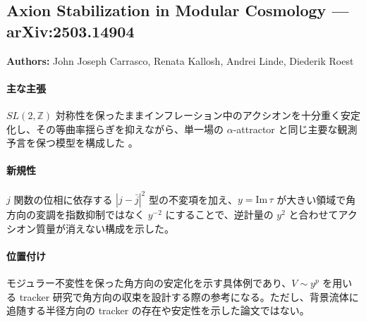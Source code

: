 \subsection{Axion Stabilization in Modular Cosmology --- arXiv:2503.14904}

\textbf{Authors:} John Joseph Carrasco, Renata Kallosh, Andrei Linde, Diederik Roest

\paragraph{主な主張}
$SL(2,\mathbb{Z})$ 対称性を保ったままインフレーション中のアクシオンを十分重く安定化し、その等曲率揺らぎを抑えながら、単一場の $\alpha$-attractor と同じ主要な観測予言を保つ模型を構成した \cite{Carrasco:2025axion}。

\paragraph{新規性}
$j$ 関数の位相に依存する $|j-\bar j|^2$ 型の不変項を加え、$y=\mathrm{Im}\,\tau$ が大きい領域で角方向の変調を指数抑制ではなく $y^{-2}$ にすることで、逆計量の $y^2$ と合わせてアクシオン質量が消えない構成を示した。

\paragraph{位置付け}
モジュラー不変性を保った角方向の安定化を示す具体例であり、$V\sim y^p$ を用いる tracker 研究で角方向の収束を設計する際の参考になる。ただし、背景流体に追随する半径方向の tracker の存在や安定性を示した論文ではない。
